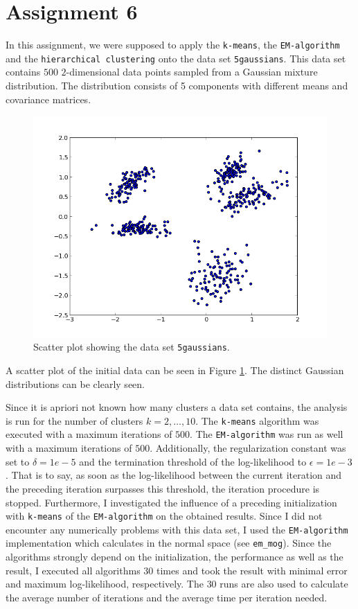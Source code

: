 \documentclass[a4paper, 12pt, titlepage]{article}
\begin{document}
\section{Assignment 6}

In this assignment, we were supposed to apply the \texttt{k-means}, the \texttt{EM-algorithm} and the \texttt{hierarchical clustering} onto the data set \texttt{5gaussians}.
This data set contains $500$ $2$-dimensional data points sampled from a Gaussian mixture distribution.
The distribution consists of 5 components with different means and covariance matrices.
\begin{figure}
	\centering
	\includegraphics[width=12cm]{images/5gaussians.png}
	\caption{Scatter plot showing the data set \texttt{5gaussians}.}
	\label{fig:5gaussians}
\end{figure}
A scatter plot of the initial data can be seen in Figure \ref{fig:5gaussians}.
The distinct Gaussian distributions can be clearly seen.

Since it is apriori not known how many clusters a data set contains, the analysis is run for the number of clusters $k=2,\ldots,10$.
The \texttt{k-means} algorithm was executed with a maximum iterations of $500$.
The \texttt{EM-algorithm} was run as well with a maximum iterations of $500$.
Additionally, the regularization constant was set to $\delta = 1e-5$ and the termination threshold of the log-likelihood to $\epsilon = 1e-3$.
That is to say, as soon as the log-likelihood between the current iteration and the preceding iteration surpasses this threshold, the iteration procedure is stopped.
Furthermore, I investigated the influence of a preceding initialization with \texttt{k-means} of the \texttt{EM-algorithm} on the obtained results.
Since I did not encounter any numerically problems with this data set, I used the \texttt{EM-algorithm} implementation which calculates in the normal space (see \texttt{em\_mog}).
Since the algorithms strongly depend on the initialization, the performance as well as the result, I executed all algorithms $30$ times and took the result with minimal error and maximum log-likelihood, respectively.
The $30$ runs are also used to calculate the average number of iterations and the average time per iteration needed.
\end{document}
